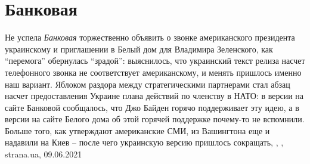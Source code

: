  
 
 
 
 
\chapter{Банковая}
\label{sec:slova.bankovaja}

Не успела \emph{Банковая} торжественно объявить о звонке американского
президента украинскому и приглашении в Белый дом для Владимира Зеленского, как
\enquote{перемога} обернулась \enquote{зрадой}: выяснилось, что украинский
текст релиза насчет телефонного звонка не соответствует американскому, и менять
пришлось именно наш вариант.  Яблоком раздора между стратегическими партнерами
стал абзац насчет предоставления Украине плана действий по членству в НАТО: в
версии на сайте Банковой сообщалось, что Джо Байден горячо поддерживает эту
идею, а в версии на сайте Белого дома об этой горячей поддержке почему-то не
вспомнили. Больше того, как утверждают американские СМИ, из Вашингтона еще и
надавили на Киев – после чего украинскую версию пришлось сокращать,
, , strana.ua, 09.06.2021


